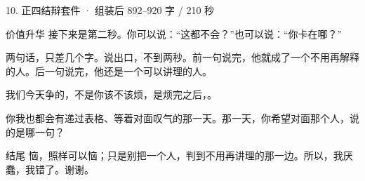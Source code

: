 \documentclass[script,pro]{debate}
\begin{document}
\begin{kit}{10. 正四结辩}{套件 · 组装后 892–920 字 / 210 秒}
\begin{fixed}{价值升华}
接下来是第二秒。你可以说：“这都不会？”也可以说：“你卡在哪？”

两句话，只差几个字。说出口，不到两秒。前一句说完，他就成了一个不用再解释的人。后一句说完，他还是一个可以讲理的人。

我们今天争的，不是你该不该烦，是烦完之后，。

你我也都会有递过表格、等着对面叹气的那一天。那一天，你希望对面那个人，说的是哪一句？
\end{fixed}
\begin{fixed}{结尾}
恼，照样可以恼；只是别把一个人，判到不用再讲理的那一边。所以，我厌蠢，我错了。谢谢。
\end{fixed}
\end{kit}
\begin{contingency}
\end{contingency}
\end{document}
